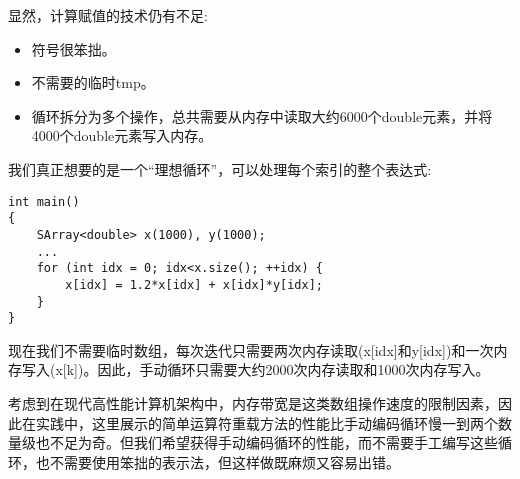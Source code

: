 显然，计算赋值的技术仍有不足:

\begin{itemize}
\item 
符号很笨拙。

\item 
不需要的临时tmp。

\item 
循环拆分为多个操作，总共需要从内存中读取大约6000个double元素，并将4000个double元素写入内存。
\end{itemize}

我们真正想要的是一个“理想循环”，可以处理每个索引的整个表达式:

\begin{lstlisting}[style=styleCXX]
int main()
{
	SArray<double> x(1000), y(1000);
	...
	for (int idx = 0; idx<x.size(); ++idx) {
		x[idx] = 1.2*x[idx] + x[idx]*y[idx];
	}
}
\end{lstlisting}

现在我们不需要临时数组，每次迭代只需要两次内存读取(x[idx]和y[idx])和一次内存写入(x[k])。因此，手动循环只需要大约2000次内存读取和1000次内存写入。

考虑到在现代高性能计算机架构中，内存带宽是这类数组操作速度的限制因素，因此在实践中，这里展示的简单运算符重载方法的性能比手动编码循环慢一到两个数量级也不足为奇。但我们希望获得手动编码循环的性能，而不需要手工编写这些循环，也不需要使用笨拙的表示法，但这样做既麻烦又容易出错。















